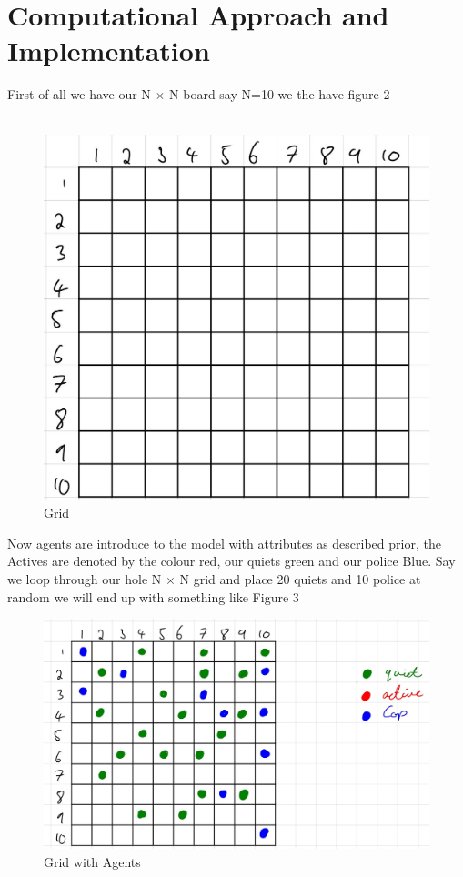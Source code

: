 \documentclass[11pt]{article}
\begin{document}
	
	

	
	\newpage
	\section{Computational Approach and Implementation}
	
	First of all we have our N $\times$ N board say N=10 we the have figure 2\\
	\\
	\begin{figure}[H]
		\includegraphics[width=\linewidth]{Visual Grid.png}
		\caption{Grid}
		\label{fig:frenchriot}
	\end{figure}
	Now agents are introduce to the model with attributes as described prior, the Actives are denoted by the colour red, our quiets  green and our police Blue. Say we loop through our hole N $\times$ N grid and place 20 quiets and 10 police at random we will end up with something like Figure 3\\
	\begin{figure}[H]
		\includegraphics[width=\linewidth]{cops and quiets on grid visual.png}
		\caption{Grid with Agents}
		\label{fig:frenchriot}
	\end{figure}
\end{document}
